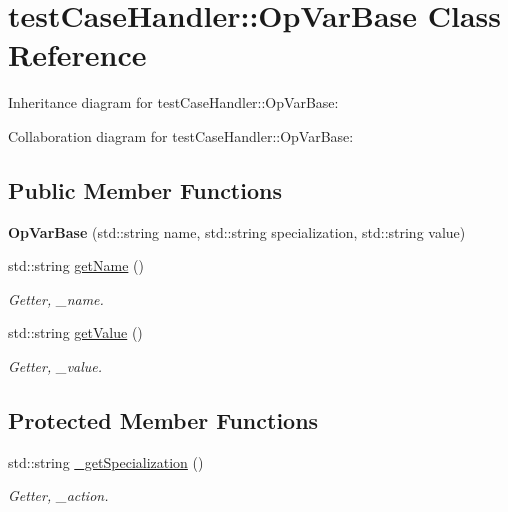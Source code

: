 \hypertarget{classtestCaseHandler_1_1OpVarBase}{}\section{test\+Case\+Handler\+::Op\+Var\+Base Class Reference}
\label{classtestCaseHandler_1_1OpVarBase}


Inheritance diagram for test\+Case\+Handler\+::Op\+Var\+Base\+:


Collaboration diagram for test\+Case\+Handler\+::Op\+Var\+Base\+:
\subsection*{Public Member Functions}
\begin{DoxyCompactItemize}
\item 
\mbox{\label{classtestCaseHandler_1_1OpVarBase_aeebad87dde68afbab1b634aa6ad24112}} 
{\bfseries Op\+Var\+Base} (std\+::string name, std\+::string specialization, std\+::string value)
\item 
std\+::string \mbox{\hyperlink{classtestCaseHandler_1_1OpVarBase_aa493e51a8cd2c6ca0734acd8154b65ef}{get\+Name}} ()
\begin{DoxyCompactList}\small\item\em Getter, \+\_\+name. \end{DoxyCompactList}\item 
std\+::string \mbox{\hyperlink{classtestCaseHandler_1_1OpVarBase_a3a35bbf670913c27a7ed98ef2a71e665}{get\+Value}} ()
\begin{DoxyCompactList}\small\item\em Getter, \+\_\+value. \end{DoxyCompactList}\end{DoxyCompactItemize}
\subsection*{Protected Member Functions}
\begin{DoxyCompactItemize}
\item 
std\+::string \mbox{\hyperlink{classtestCaseHandler_1_1OpVarBase_a2bb0e2b84284e726c7dbdf2a9fbe17e9}{\+\_\+get\+Specialization}} ()
\begin{DoxyCompactList}\small\item\em Getter, \+\_\+action. \end{DoxyCompactList}\end{DoxyCompactItemize}


